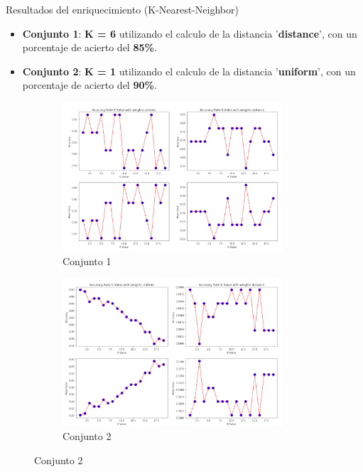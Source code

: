 \documentclass[10pt]{beamer}
\begin{document}
\begin{frame}{Resultados del enriquecimiento (K-Nearest-Neighbor)}
  \begin{itemize}
  	\item \textbf{Conjunto 1}: \textbf{K = 6} utilizando el calculo de la distancia '\textbf{distance}', con un porcentaje de acierto del \textbf{85\%}.
  	\item \textbf{Conjunto 2}: \textbf{K = 1} utilizando el calculo de la distancia '\textbf{uniform}', con un porcentaje de acierto del \textbf{90\%}.
  \end{itemize}
  \begin{figure}[!htb]
    \begin{subfigure}[b]{0.45\linewidth}
    	\centering
	    \includegraphics[width=0.9\textwidth]{images/resultados_knn_ent_conjunto1.png}
	    \caption{Conjunto 1}
	\end{subfigure}
	\begin{subfigure}[b]{0.45\linewidth} 
		\centering
		\includegraphics[width=0.9\textwidth]{images/resultados_knn_ent_conjunto2.png}
	    \caption{Conjunto 2}
	\end{subfigure}
  \end{figure}
\end{frame}
\end{document}
